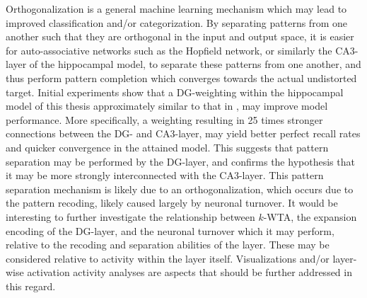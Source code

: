 Orthogonalization is a general machine learning mechanism which may lead to improved classification and/or categorization. By separating patterns from one another such that they are orthogonal in the input and output space, it is easier for auto-associative networks such as the Hopfield network, or similarly the CA3-layer of the hippocampal model, to separate these patterns from one another, and thus perform pattern completion which converges towards the actual undistorted target.
Initial experiments show that a DG-weighting within the hippocampal model of this thesis approximately similar to that in \citep{Wakagi2008}, may improve model performance. More specifically, a weighting resulting in 25 times stronger connections between the DG- and CA3-layer, may yield better perfect recall rates and quicker convergence in the attained model. This suggests that pattern separation may be performed by the DG-layer, and confirms the hypothesis that it may be more strongly interconnected with the CA3-layer. This pattern separation mechanism is likely due to an orthogonalization, which occurs due to the pattern recoding, likely caused largely by neuronal turnover. It would be interesting to further investigate the relationship between $k$-WTA, the expansion encoding of the DG-layer, and the neuronal turnover which it may perform, relative to the recoding and separation abilities of the layer. These may be considered relative to activity within the layer itself. Visualizations and/or layer-wise activation activity analyses are aspects that should be further addressed in this regard.

